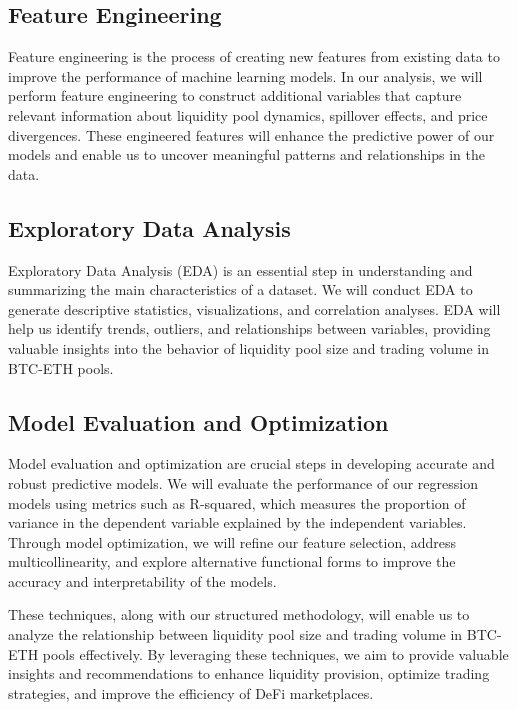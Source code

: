 \documentclass{article}
\begin{document}
{\subsection*{Feature Engineering}

Feature engineering is the process of creating new features from existing data to improve the performance of machine learning models. In our analysis, we will perform feature engineering to construct additional variables that capture relevant information about liquidity pool dynamics, spillover effects, and price divergences. These engineered features will enhance the predictive power of our models and enable us to uncover meaningful patterns and relationships in the data.

\subsection*{Exploratory Data Analysis}

Exploratory Data Analysis (EDA) is an essential step in understanding and summarizing the main characteristics of a dataset. We will conduct EDA to generate descriptive statistics, visualizations, and correlation analyses. EDA will help us identify trends, outliers, and relationships between variables, providing valuable insights into the behavior of liquidity pool size and trading volume in BTC-ETH pools.

\subsection*{Model Evaluation and Optimization}

Model evaluation and optimization are crucial steps in developing accurate and robust predictive models. We will evaluate the performance of our regression models using metrics such as R-squared, which measures the proportion of variance in the dependent variable explained by the independent variables. Through model optimization, we will refine our feature selection, address multicollinearity, and explore alternative functional forms to improve the accuracy and interpretability of the models.

These techniques, along with our structured methodology, will enable us to analyze the relationship between liquidity pool size and trading volume in BTC-ETH pools effectively. By leveraging these techniques, we aim to provide valuable insights and recommendations to enhance liquidity provision, optimize trading strategies, and improve the efficiency of DeFi marketplaces.




}
\end{document}
